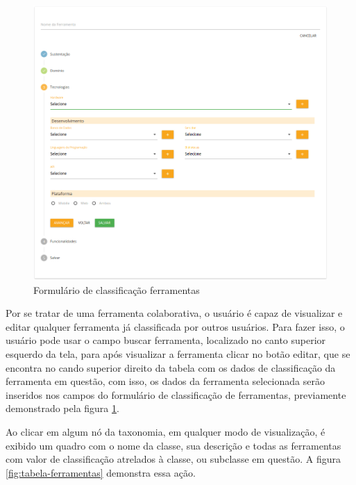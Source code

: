 \begin{figure}[!ht]
    \centering
    \includegraphics[scale=0.20]{./figuras/new-ferramenta.png}
    \caption{Formulário de classificação ferramentas}
    \label{fig:new-ferramenta}
\end{figure}

\par
Por se tratar de uma ferramenta colaborativa, o usuário é capaz de visualizar e editar qualquer ferramenta já classificada por outros usuários. 
Para fazer isso, o usuário pode usar o campo buscar ferramenta, localizado no canto superior esquerdo da tela, para após visualizar a ferramenta clicar no botão editar, que 
se encontra no cando superior direito da tabela com os dados de classificação da ferramenta em questão, com isso, os dados da ferramenta selecionada serão inseridos nos
campos do formulário de classificação de ferramentas, previamente demonstrado pela figura \ref{fig:new-ferramenta}. 

\newpage
\par
Ao clicar em algum nó da taxonomia, em qualquer modo de visualização, é exibido um quadro com o nome da classe, sua descrição e todas as ferramentas
com valor de classificação atrelados à classe, ou subclasse em questão. A figura \ref{fig:tabela-ferramentas} demonstra essa ação. 

